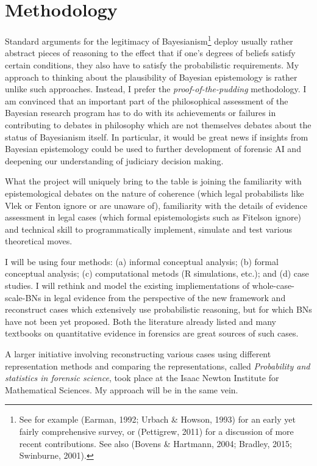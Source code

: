 \documentclass[11pt,dvipsnames,enabledeprecatedfontcommands]{scrartcl}
\begin{document}
\hypertarget{methodology}{%
\section{Methodology}\label{methodology}}

Standard arguments for the legitimacy of Bayesianism\footnote{See for
  example (Earman, 1992; Urbach \& Howson, 1993) for an early yet fairly
  comprehensive survey, or (Pettigrew, 2011) for a discussion of more
  recent contributions. See also (Bovens \& Hartmann, 2004; Bradley,
  2015; Swinburne, 2001).} deploy usually rather abstract pieces of
reasoning to the effect that if one's degrees of beliefs satisfy certain
conditions, they also have to satisfy the probabilistic requirements. My
approach to thinking about the plausibility of Bayesian epistemology is
rather unlike such approaches. Instead, I prefer the
\emph{proof-of-the-pudding} methodology. I am convinced that an
important part of the philosophical assessment of the Bayesian research
program has to do with its achievements or failures in contributing to
debates in philosophy which are not themselves debates about the status
of Bayesianism itself. In particular, it would be great news if insights
from Bayesian epistemology could be used to further development of
forensic AI and deepening our understanding of judiciary decision
making.

What the project will uniquely bring to the table is joining the
familiarity with epistemological debates on the nature of coherence
(which legal probabilists like Vlek or Fenton ignore or are unaware of),
familiarity with the details of evidence assessment in legal cases
(which formal epistemologists such as Fitelson ignore) and technical
skill to programmatically implement, simulate and test various
theoretical moves.

I will be using four methods: (a) informal conceptual analysis; (b)
formal conceptual analysis; (c) computational metods (R simulations,
etc.); and (d) case studies. I will rethink and model the existing
impliementations of whole-case-scale-BNs in legal evidence from the
perspective of the new framework and reconstruct cases which extensively
use probabilistic reasoning, but for which BNs have not been yet
proposed. Both the literature already listed and many textbooks on
quantitative evidence in forensics are great sources of such cases.

A larger initiative involving reconstructing various cases using
different representation methods and comparing the representations,
called \emph{Probability and statistics in forensic science}, took place
at the Isaac Newton Institute for Mathematical Sciences. My approach
will be in the same vein.
\end{document}
